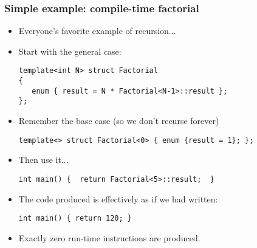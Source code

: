 \begin{frame}[fragile,t]
\frametitle{Simple example: compile-time factorial}
\begin{itemize}[<+->]
\item Everyone's favorite example of recursion...
\item Start with the general case:
{\scriptsize\begin{verbatim}
template<int N> struct Factorial
{
   enum { result = N * Factorial<N-1>::result };
};

\end{verbatim}
}
\item Remember the base case (so we don't recurse forever)
{\scriptsize\begin{verbatim}
template<> struct Factorial<0> { enum {result = 1}; };

\end{verbatim}
}
\item Then use it...
{\scriptsize\begin{verbatim}
int main() {  return Factorial<5>::result;  }

\end{verbatim}
}

\item The code produced is effectively as if we had written:
{\scriptsize\begin{verbatim}
int main() { return 120; }

\end{verbatim}
}

\item Exactly zero run-time instructions are produced.


\end{itemize}
\end{frame}


